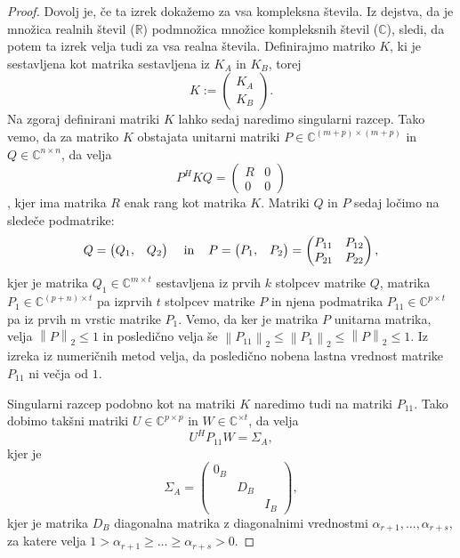 \documentclass[mat1]{article}
\newcommand{\norm}[1]{\left\lVert#1\right\rVert}
\begin{document}
\begin{proof}
Dovolj je, če ta izrek dokažemo za vsa kompleksna števila. Iz dejstva, da je množica realnih števil ($\mathbb{R}$) podmnožica množice kompleksnih števil ($\mathbb{C}$), sledi, da potem ta izrek velja tudi za vsa realna števila. Definirajmo matriko $K$, ki je sestavljena kot matrika sestavljena iz $K_A$ in $K_B$, torej $$K:= \begin{pmatrix} 
K_A \\
K_B 
\end{pmatrix}.$$
Na zgoraj definirani matriki $K$ lahko sedaj naredimo singularni razcep. Tako vemo, da za matriko $K$ obstajata unitarni matriki $P \in \mathbb{C}^{(m+p) \times (m+p)}$ in $Q \in \mathbb{C}^{n \times n}$, da velja $$ P^H K Q = 
\begin{pmatrix} 
R & 0 \\
0 & 0 
\end{pmatrix}$$, kjer ima matrika $R$ enak rang kot matrika $K$. Matriki $Q$ in $P$ sedaj ločimo na sledeče podmatrike:
$$ Q = 
\begin{pmatrix} 
Q_1, & Q_2
\end{pmatrix}
\hspace{4mm} \text{in} \hspace{4mm}
P = 
\begin{pmatrix} 
P_1, & P_2
\end{pmatrix}
=
\begin{pmatrix} 
P_{11} & P_{12} \\
P_{21} & P_{22} 
\end{pmatrix},
$$
kjer je matrika $Q_1 \in \mathbb{C}^{m \times t}$ sestavljena iz prvih $k$ stolpcev matrike $Q$, matrika $P_1 \in \mathbb{C}^{(p+n) \times t}$ pa izprvih $t$ stolpcev matrike $P$ in njena podmatrika $P_{11} \in \mathbb{C}^{p \times t}$ pa iz prvih m vrstic matrike $P_1$.
Vemo, da ker je matrika $P$ unitarna matrika, velja $\norm{P}_2 \leq 1$ in posledično velja še $\norm{P_{11}}_2 \leq \norm{P_{1}}_2 \leq \norm{P}_2 \leq 1$. Iz izreka iz numeričnih metod velja, da posledično nobena lastna vrednost matrike $P_{11}$ ni večja od $1$.

Singularni razcep podobno kot na matriki $K$ naredimo tudi na matriki $P_{11}$. Tako dobimo takšni matriki $U \in \mathbb{C}^{p \times p}$ in $W \in \mathbb{C}^{ \times t}$, da velja $$ U^H P_{11} W = \Sigma_A,$$ kjer je $$\Sigma_A = 
\begin{pmatrix} 
0_B &  & \\
 & D_B & \\
 & & I_B  
\end{pmatrix},$$ kjer je matrika $D_B$ diagonalna matrika z diagonalnimi vrednostmi $\alpha_{r+1},..., \alpha_{r+s},$ za katere velja $1 > \alpha_{r+1} \geq \ldots \geq \alpha_{r+s} > 0.$


\end{proof}
\end{document}
